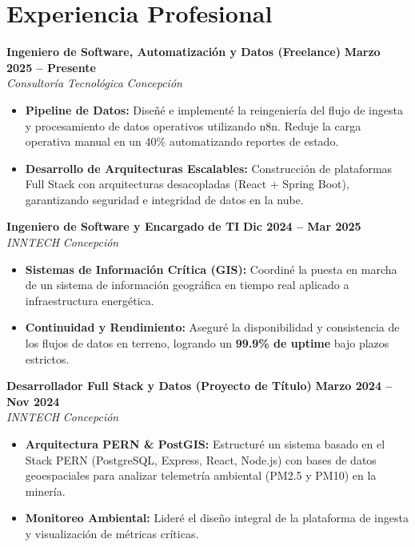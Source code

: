 \documentclass[a4paper,10pt]{article}
\begin{document}
\section{Experiencia Profesional}

\noindent \textbf{Ingeniero de Software, Automatización y Datos (Freelance)} \hfill \textbf{Marzo 2025 -- Presente} \\
\textit{Consultoría Tecnológica} \hfill \textit{Concepción}
\begin{itemize}[leftmargin=*, noitemsep, topsep=2pt]
    \item \textbf{Pipeline de Datos:} Diseñé e implementé la reingeniería del flujo de ingesta y procesamiento de datos operativos utilizando n8n. Reduje la carga operativa manual en un 40\% automatizando reportes de estado.
    \item \textbf{Desarrollo de Arquitecturas Escalables:} Construcción de plataformas Full Stack con arquitecturas desacopladas (React + Spring Boot), garantizando seguridad e integridad de datos en la nube.
\end{itemize}

\vspace{0.2cm}

\noindent \textbf{Ingeniero de Software y Encargado de TI} \hfill \textbf{Dic 2024 -- Mar 2025} \\
\textit{INNTECH} \hfill \textit{Concepción}
\begin{itemize}[leftmargin=*, noitemsep, topsep=2pt]
    \item \textbf{Sistemas de Información Crítica (GIS):} Coordiné la puesta en marcha de un sistema de información geográfica en tiempo real aplicado a infraestructura energética.
    \item \textbf{Continuidad y Rendimiento:} Aseguré la disponibilidad y consistencia de los flujos de datos en terreno, logrando un \textbf{99.9\% de uptime} bajo plazos estrictos.
\end{itemize}

\vspace{0.2cm}

\noindent \textbf{Desarrollador Full Stack y Datos (Proyecto de Título)} \hfill \textbf{Marzo 2024 -- Nov 2024} \\
\textit{INNTECH} \hfill \textit{Concepción}
\begin{itemize}[leftmargin=*, noitemsep, topsep=2pt]
    \item \textbf{Arquitectura PERN \& PostGIS:} Estructuré un sistema basado en el Stack PERN (PostgreSQL, Express, React, Node.js) con bases de datos geoespaciales para analizar telemetría ambiental (PM2.5 y PM10) en la minería.
    \item \textbf{Monitoreo Ambiental:} Lideré el diseño integral de la plataforma de ingesta y visualización de métricas críticas.
\end{itemize}
\end{document}
